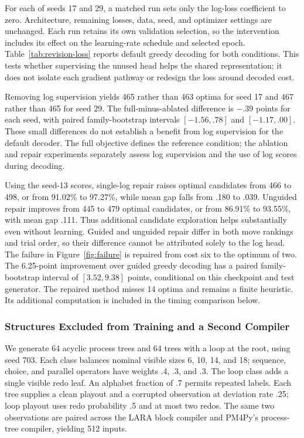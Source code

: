 \begin{revised}
For each of seeds 17 and 29, a matched run sets only the log-loss coefficient to zero. Architecture, remaining losses, data, seed, and optimizer settings are unchanged. Each run retains its own validation selection, so the intervention includes its effect on the learning-rate schedule and selected epoch. Table~\ref{tab:revision-loss} reports default greedy decoding for both conditions. This tests whether supervising the unused head helps the shared representation; it does not isolate each gradient pathway or redesign the loss around decoded cost.



Removing log supervision yields 465 rather than 463 optima for seed 17 and 467 rather than 465 for seed 29. The full-minus-ablated difference is $-.39$ points for each seed, with paired family-bootstrap intervals $[-1.56,.78]$ and $[-1.17,.00]$. These small differences do not establish a benefit from log supervision for the default decoder. The full objective defines the reference condition; the ablation and repair experiments separately assess log supervision and the use of log scores during decoding.

Using the seed-13 scores, single-log repair raises optimal candidates from 466 to 498, or from 91.02\% to 97.27\%, while mean gap falls from .180 to .039. Unguided repair improves from 445 to 479 optimal candidates, or from 86.91\% to 93.55\%, with mean gap .111. Thus additional candidate exploration helps substantially even without learning. Guided and unguided repair differ in both move rankings and trial order, so their difference cannot be attributed solely to the log head. The failure in Figure~\ref{fig:failure} is repaired from cost six to the optimum of two. The 6.25-point improvement over guided greedy decoding has a paired family-bootstrap interval of $[3.52,9.38]$ points, conditional on this checkpoint and test generator. The repaired method misses 14 optima and remains a finite heuristic. Its additional computation is included in the timing comparison below.

\subsubsection{Structures Excluded from Training and a Second Compiler}

We generate 64 acyclic process trees and 64 trees with a loop at the root, using seed 703. Each class balances nominal visible sizes 6, 10, 14, and 18; sequence, choice, and parallel operators have weights .4, .3, and .3. The loop class adds a single visible redo leaf. An alphabet fraction of .7 permits repeated labels. Each tree supplies a clean playout and a corrupted observation at deviation rate .25; loop playout uses redo probability .5 and at most two redos. The same two observations are paired across the LARA block compiler and PM4Py's process-tree compiler, yielding 512 inputs.


\end{revised}
